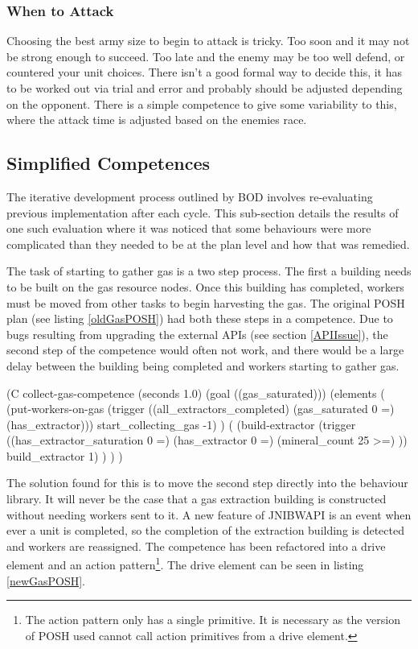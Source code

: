 \documentclass[11pt,openright,a4paper]{report}
\begin{document}
\subsubsection{When to Attack}
Choosing the best army size to begin to attack is tricky. Too soon and it may not be strong enough to succeed. Too late and the enemy may be too well defend, or countered your unit choices. There isn't a good formal way to decide this, it has to be worked out via trial and error and probably should be adjusted depending on the opponent. There is a simple competence to give some variability to this, where the attack time is adjusted based on the enemies race.


\subsection{Simplified Competences}
The iterative development process outlined by BOD involves re-evaluating previous implementation after each cycle. This sub-section details the results of one such evaluation where it was noticed that some behaviours were more complicated than they needed to be at the plan level and how that was remedied.

The task of starting to gather gas is a two step process. The first a building needs to be built on the gas resource nodes. Once this building has completed, workers must be moved from other tasks to begin harvesting the gas. The original POSH plan (see listing \ref{oldGasPOSH}) had both these steps in a competence. Due to bugs resulting from upgrading the external APIs (see section \ref{APIIssue}), the second step of the competence would often not work, and there would be a large delay between the building being completed and workers starting to gather gas.

\begin{Code}[frame=single,language=Lisp,tabsize=4,breaklines,breakatwhitespace,caption={The original POSH competence to manage collecting gas},label=oldGasPOSH]
	(C collect-gas-competence (seconds 1.0) (goal ((gas_saturated)))
		(elements
			(
				(put-workers-on-gas (trigger ((all_extractors_completed)
					(gas_saturated 0 =)
					(has_extractor))) start_collecting_gas -1)
			)
			(
				(build-extractor (trigger ((has_extractor_saturation 0 =)
					(has_extractor 0 =)
					(mineral_count 25 >=)
					)) build_extractor 1)
			)
		)
	)
\end{Code}

The solution found for this is to move the second step directly into the behaviour library. It will never be the case that a gas extraction building is constructed without needing workers sent to it. A new feature of JNIBWAPI is an event when ever a unit is completed, so the completion of the extraction building is detected and workers are reassigned. The competence has been refactored into a drive element and an action pattern\footnote{The action pattern only has a single primitive. It is necessary as the version of POSH used cannot call action primitives from a drive element.}. The drive element can be seen in listing \ref{newGasPOSH}.
\end{document}
